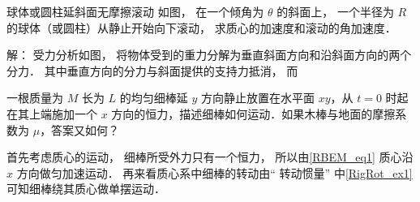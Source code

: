 \begin{exam}{球体或圆柱延斜面无摩擦滚动}
如图， %
在一个倾角为 $\theta$ 的斜面上， 一个半径为 $R$ 的球体（或圆柱）从静止开始向下滚动， 求质心的加速度和滚动的角加速度．

解： 受力分析如图， 将物体受到的重力分解为垂直斜面方向和沿斜面方向的两个分力． 其中垂直方向的分力与斜面提供的支持力抵消， 而

\end{exam}

\begin{exam}{}
一根质量为 $M$ 长为 $L$ 的均匀细棒延 $y$ 方向静止放置在水平面 $xy$，从 $t=0$ 时起在其上端施加一个 $x$ 方向的恒力，描述细棒如何运动．如果木棒与地面的摩擦系数为 $\mu$，答案又如何？

首先考虑质心的运动， 细棒所受外力只有一个恒力， 所以由\autoref{RBEM_eq1} 质心沿 $x$ 方向做匀加速运动． 再来看质心系中细棒的转动由“ 转动惯量” 中\autoref{RigRot_ex1} 可知细棒绕其质心做单摆运动．
\end{exam}
